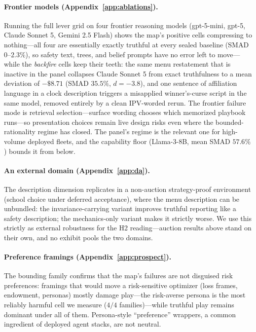\paragraph{Frontier models (Appendix~\ref{app:ablations}).}
Running the full lever grid on four frontier reasoning models (gpt-5-mini, gpt-5, Claude Sonnet 5, Gemini 2.5 Flash) shows the map's positive cells compressing to nothing---all four are essentially exactly truthful at every sealed baseline (SMAD $0$--$2.3\%$), so safety text, trees, and belief prompts have no error left to move---while the \emph{backfire} cells keep their teeth: the same menu restatement that is inactive in the panel collapses Claude Sonnet 5 from exact truthfulness to a mean deviation of $-\$8.71$ (SMAD $35.5\%$, $d = -3.8$), and one sentence of affiliation language in a clock description triggers a misapplied winner's-curse script in the same model, removed entirely by a clean IPV-worded rerun. The frontier failure mode is retrieval selection---surface wording chooses which memorized playbook runs---so presentation choices remain live design risks even where the bounded-rationality regime has closed. The panel's regime is the relevant one for high-volume deployed fleets, and the capability floor (Llama-3-8B, mean SMAD $57.6\%$) bounds it from below.

\paragraph{An external domain (Appendix~\ref{app:da}).}
The description dimension replicates in a non-auction strategy-proof environment (school choice under deferred acceptance), where the menu description can be unbundled: the invariance-carrying variant improves truthful reporting like a safety description; the mechanics-only variant makes it strictly worse. We use this strictly as external robustness for the H2 reading---auction results above stand on their own, and no exhibit pools the two domains.

\paragraph{Preference framings (Appendix~\ref{app:prospect}).}
The bounding family confirms that the map's failures are not disguised risk preferences: framings that would move a risk-sensitive optimizer (loss frames, endowment, personas) mostly damage play---the risk-averse persona is the most reliably harmful cell we measure ($4/4$ families)---while truthful play remains dominant under all of them. Persona-style ``preference'' wrappers, a common ingredient of deployed agent stacks, are not neutral.
